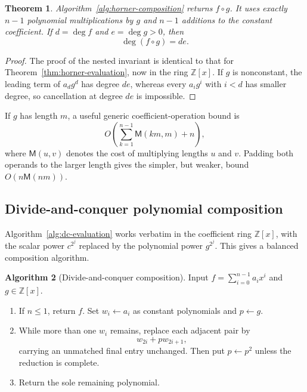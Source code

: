 \documentclass[11pt]{book}
\newtheorem{theorem}{Theorem}[section]
\theoremstyle{definition}
\newtheorem{algorithm}[theorem]{Algorithm}
\newcommand{\ZZ}{\mathbb Z}
\begin{document}
\begin{theorem}\label{thm:horner-composition}
Algorithm~\ref{alg:horner-composition} returns $f\circ g$.  It uses exactly
$n-1$ polynomial multiplications by $g$ and $n-1$ additions to the constant
coefficient.  If $d=\deg f$ and $e=\deg g>0$, then
\[
 \deg(f\circ g)=de.
\]
\end{theorem}

\begin{proof}
The proof of the nested invariant is identical to that for
Theorem~\ref{thm:horner-evaluation}, now in the ring $\ZZ[x]$.  If $g$ is
nonconstant, the leading term of $a_dg^d$ has degree $de$, whereas every
$a_i g^i$ with $i<d$ has smaller degree, so cancellation at degree $de$ is
impossible.
\end{proof}

If $g$ has length $m$, a useful generic coefficient-operation bound is
\begin{equation}\label{eq:horner-composition-cost}
 O\left(\sum_{k=1}^{n-1}\mathsf M(km,m)+n\right),
\end{equation}
where $\mathsf M(u,v)$ denotes the cost of multiplying lengths $u$ and $v$.
Padding both operands to the larger length gives the simpler, but weaker,
bound $O(n\mathsf M(nm))$.

\subsection{Divide-and-conquer polynomial composition}

Algorithm~\ref{alg:dc-evaluation} works verbatim in the coefficient ring
$\ZZ[x]$, with the scalar power $c^{2^j}$ replaced by the polynomial power
$g^{2^j}$.  This gives a balanced composition algorithm.

\begin{algorithm}[Divide-and-conquer composition]\label{alg:dc-composition}
Input $f=\sum_{i=0}^{n-1}a_ix^i$ and $g\in\ZZ[x]$.
\begin{enumerate}
 \item If $n\le1$, return $f$.  Set $w_i\leftarrow a_i$ as constant
 polynomials and $p\leftarrow g$.
 \item While more than one $w_i$ remains, replace each adjacent pair by
 \[
    w_{2i}+p w_{2i+1},
 \]
 carrying an unmatched final entry unchanged.  Then put $p\leftarrow p^2$
 unless the reduction is complete.
 \item Return the sole remaining polynomial.
\end{enumerate}
\end{algorithm}
\end{document}
